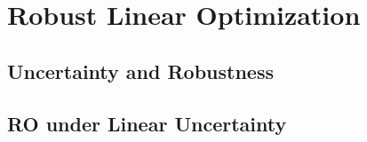 \documentclass{bookest}
\begin{document}
	

	\tableofcontents
	
	\part{Robust Linear Optimization}
	
	\chapter{Uncertainty and Robustness} \label{chapter_1}
	
	
	\chapter{RO under Linear Uncertainty} \label{chapter_2}
	
	

		
	
%		
%	
%	
%	
%	
	
\end{document}
